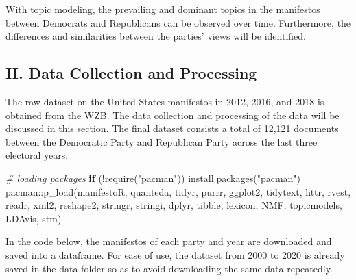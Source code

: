\documentclass[
]{article}
\newenvironment{Shaded}{\begin{snugshade}}{\end{snugshade}}
\newcommand{\CommentTok}[1]{\textcolor[rgb]{0.56,0.35,0.01}{\textit{#1}}}
\newcommand{\ControlFlowTok}[1]{\textcolor[rgb]{0.13,0.29,0.53}{\textbf{#1}}}
\newcommand{\FunctionTok}[1]{\textcolor[rgb]{0.00,0.00,0.00}{#1}}
\newcommand{\NormalTok}[1]{#1}
\newcommand{\SpecialCharTok}[1]{\textcolor[rgb]{0.00,0.00,0.00}{#1}}
\newcommand{\StringTok}[1]{\textcolor[rgb]{0.31,0.60,0.02}{#1}}
\begin{document}
With topic modeling, the prevailing and dominant topics in the
manifestos between Democrats and Republicans can be observed over time.
Furthermore, the differences and similarities between the parties' views
will be identified.

\hypertarget{ii.-data-collection-and-processing}{%
\subsection{II. Data Collection and
Processing}\label{ii.-data-collection-and-processing}}

The raw dataset on the United States manifestos in 2012, 2016, and 2018
is obtained from the \href{https://manifesto-project.wzb.eu/}{WZB}. The
data collection and processing of the data will be discussed in this
section. The final dataset consists a total of 12,121 documents between
the Democratic Party and Republican Party across the last three
electoral years.

\begin{Shaded}
\begin{Highlighting}[]
\CommentTok{\# loading packages}
\ControlFlowTok{if}\NormalTok{ (}\SpecialCharTok{!}\FunctionTok{require}\NormalTok{(}\StringTok{"pacman"}\NormalTok{)) }\FunctionTok{install.packages}\NormalTok{(}\StringTok{"pacman"}\NormalTok{)}
\NormalTok{pacman}\SpecialCharTok{::}\FunctionTok{p\_load}\NormalTok{(manifestoR, quanteda, tidyr, purrr, ggplot2, }
\NormalTok{               tidytext, httr, rvest, readr, xml2, reshape2,}
\NormalTok{               stringr, stringi, dplyr, tibble, lexicon,}
\NormalTok{               NMF, topicmodels, LDAvis, stm)}
\end{Highlighting}
\end{Shaded}

In the code below, the manifestos of each party and year are downloaded
and saved into a dataframe. For ease of use, the dataset from 2000 to
2020 is already saved in the data folder so as to avoid downloading the
same data repeatedly.
\end{document}
